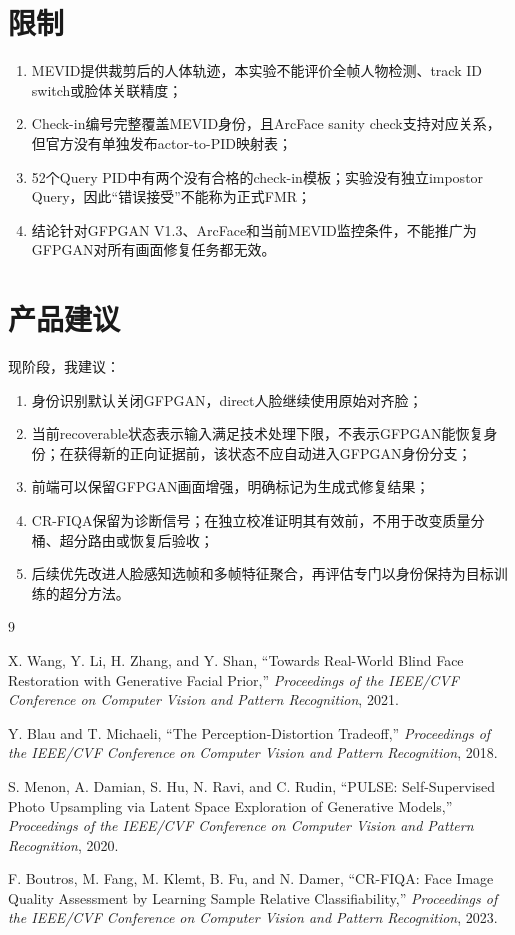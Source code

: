 \documentclass[UTF8,a4paper,11pt]{ctexart}
\begin{document}
\section{限制}

\begin{enumerate}[leftmargin=2.2em]
  \item MEVID提供裁剪后的人体轨迹，本实验不能评价全帧人物检测、track ID switch或脸体关联精度；
  \item Check-in编号完整覆盖MEVID身份，且ArcFace sanity check支持对应关系，但官方没有单独发布actor-to-PID映射表；
  \item 52个Query PID中有两个没有合格的check-in模板；实验没有独立impostor Query，因此``错误接受''不能称为正式FMR；
  \item 结论针对GFPGAN V1.3、ArcFace和当前MEVID监控条件，不能推广为GFPGAN对所有画面修复任务都无效。
\end{enumerate}

\section{产品建议}

现阶段，我建议：

\begin{enumerate}[leftmargin=2.2em]
  \item 身份识别默认关闭GFPGAN，direct人脸继续使用原始对齐脸；
  \item 当前recoverable状态表示输入满足技术处理下限，不表示GFPGAN能恢复身份；在获得新的正向证据前，该状态不应自动进入GFPGAN身份分支；
  \item 前端可以保留GFPGAN画面增强，明确标记为生成式修复结果；
  \item CR-FIQA保留为诊断信号；在独立校准证明其有效前，不用于改变质量分桶、超分路由或恢复后验收；
  \item 后续优先改进人脸感知选帧和多帧特征聚合，再评估专门以身份保持为目标训练的超分方法。
\end{enumerate}

\footnotesize
\begin{thebibliography}{9}

X. Wang, Y. Li, H. Zhang, and Y. Shan,
``Towards Real-World Blind Face Restoration with Generative Facial Prior,''
\textit{Proceedings of the IEEE/CVF Conference on Computer Vision and Pattern Recognition},
2021.

Y. Blau and T. Michaeli,
``The Perception-Distortion Tradeoff,''
\textit{Proceedings of the IEEE/CVF Conference on Computer Vision and Pattern Recognition},
2018.

S. Menon, A. Damian, S. Hu, N. Ravi, and C. Rudin,
``PULSE: Self-Supervised Photo Upsampling via Latent Space Exploration of Generative Models,''
\textit{Proceedings of the IEEE/CVF Conference on Computer Vision and Pattern Recognition},
2020.

F. Boutros, M. Fang, M. Klemt, B. Fu, and N. Damer,
``CR-FIQA: Face Image Quality Assessment by Learning Sample Relative Classifiability,''
\textit{Proceedings of the IEEE/CVF Conference on Computer Vision and Pattern Recognition},
2023.

\end{thebibliography}
\normalsize
\end{document}
